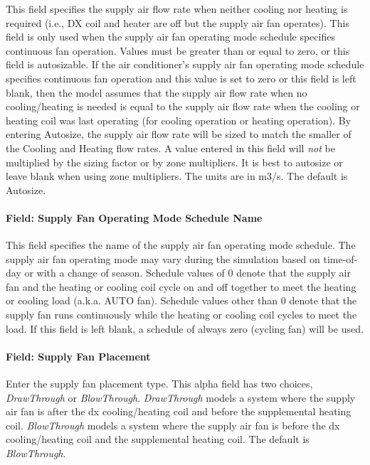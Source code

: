 This field specifies the supply air flow rate when neither cooling nor heating is required (i.e., DX coil and heater are off but the supply air fan operates). This field is only used when the supply air fan operating mode schedule specifies continuous fan operation. Values must be greater than or equal to zero, or this field is autosizable. If the air conditioner's supply air fan operating mode schedule specifies continuous fan operation and this value is set to zero or this field is left blank, then the model assumes that the supply air flow rate when no cooling/heating is needed is equal to the supply air flow rate when the cooling or heating coil was last operating (for cooling operation or heating operation). By entering Autosize, the supply air flow rate will be sized to match the smaller of the Cooling and Heating flow rates. A value entered in this field will \emph{not} be multiplied by the sizing factor or by zone multipliers. It is best to autosize or leave blank when using zone multipliers. The units are in m3/s. The default is Autosize.

\paragraph{Field: Supply Fan Operating Mode Schedule Name}\label{field-supply-fan-operating-mode-schedule-name-5}

This field specifies the name of the supply air fan operating mode schedule. The supply air fan operating mode may vary during the simulation based on time-of-day or with a change of season. Schedule values of 0 denote that the supply air fan and the heating or cooling coil cycle on and off together to meet the heating or cooling load (a.k.a. AUTO fan). Schedule values other than 0 denote that the supply fan runs continuously while the heating or cooling coil cycles to meet the load. If this field is left blank, a schedule of always zero (cycling fan) will be used.

\paragraph{Field: Supply Fan Placement}\label{field-supply-fan-placement-5}

Enter the supply fan placement type. This alpha field has two choices, \emph{DrawThrough} or \emph{BlowThrough}. \emph{DrawThrough} models a system where the supply air fan is after the dx cooling/heating coil and before the supplemental heating coil. \emph{BlowThrough} models a system where the supply air fan is before the dx cooling/heating coil and the supplemental heating coil. The default is \emph{BlowThrough}.

